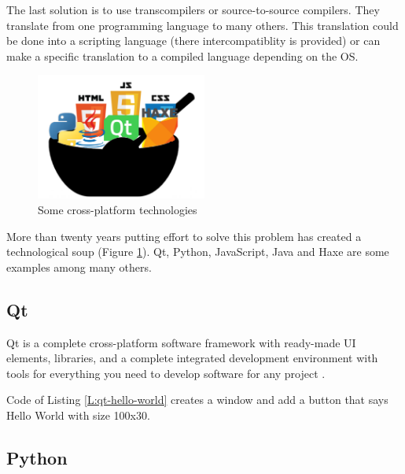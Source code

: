 The last solution is to use transcompilers or source-to-source compilers.
They translate from one programming language to many others. This translation
could be done into a scripting language (there intercompatiblity is provided) or
can make a specific translation to a compiled language depending on the OS.

\begin{figure}[htb]
	\begin{center}
		\includegraphics[width=0.5\textwidth]{./figures/techsoup.png}
		\caption{Some cross-platform technologies}
		\label{F:tech-soup}
	\end{center}
\end{figure}


More than twenty years putting effort to solve this problem has created a 
technological soup (Figure \ref{F:tech-soup}). Qt, Python, JavaScript, Java and 
Haxe
\cite{qt-web}\cite{py-web}\cite{js-wiki}\cite{what-is-java}\cite{what-is-haxe}
are some examples among many others.

\subsection{Qt}

Qt is a complete cross-platform software framework with ready-made UI elements,
\CC libraries, and a complete integrated development environment with tools for 
everything you need to develop software for any project \cite{qt-web}.

\begin{codefigure}
\end{codefigure}

Code of Listing \ref{L:qt-hello-world} creates a window and add a button that
says Hello World with size 100x30.

\subsection{Python}

